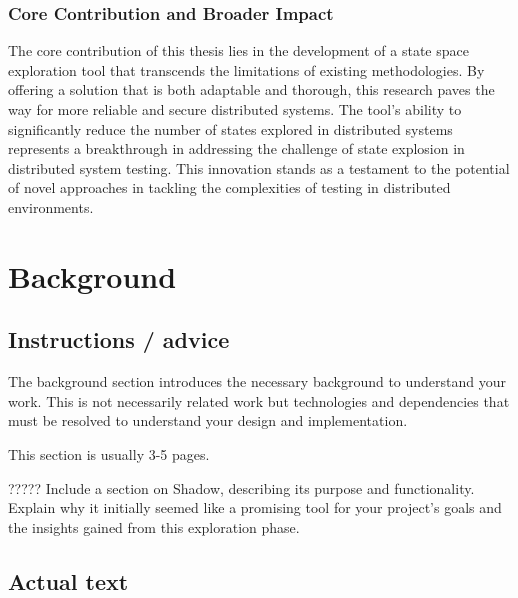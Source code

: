 \documentclass[a4paper,11pt,oneside]{report}
\begin{document}
\subsection{Core Contribution and Broader Impact}
The core contribution of this thesis lies in the development of a state space exploration tool that transcends the limitations of existing methodologies. By offering a solution that is both adaptable and thorough, this research paves the way for more reliable and secure distributed systems. The tool's ability to significantly reduce the number of states explored in distributed systems represents a breakthrough in addressing the challenge of state explosion in distributed system testing. This innovation stands as a testament to the potential of novel approaches in tackling the complexities of testing in distributed environments.


\chapter{Background}

\section{Instructions / advice}
The background section introduces the necessary background to understand your
work. This is not necessarily related work but technologies and dependencies
that must be resolved to understand your design and implementation.

This section is usually 3-5 pages.

?????
Include a section on Shadow, describing its purpose and functionality. Explain why it initially seemed like a promising tool for your project's goals and the insights gained from this exploration phase.

\section{Actual text}
\end{document}

